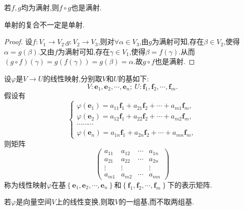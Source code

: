 \documentclass[lang=cn,newtx,10pt,scheme=chinese]{elegantbook}
\begin{document}
\begin{proposition}[满射的复合仍是满射]\label{proposition:满射的复合仍是满射}
    若\(f,g\)均为满射,则\(f\circ g\)也是满射.
\end{proposition}
\begin{remark}
    单射的复合不一定是单射.
\end{remark}
\begin{proof}
    设\(f:V_1\rightarrow V_2\),\(g:V_2\rightarrow V_3\),则对\(\forall \alpha \in V_3\),由\(g\)为满射可知,存在\(\beta \in V_2\),使得\(\alpha = g(\beta)\).又由\(f\)为满射可知,存在\(\gamma \in V_1\),使得\(\beta = f(\gamma)\).从而\((g\circ f)(\gamma)=g(f(\gamma)) = g(\beta)=\alpha\).故\(g\circ f\)也是满射.
\end{proof}

\begin{definition}[线性映射的表示矩阵]\label{definition:线性映射的表示矩阵}
设\(\varphi\)是\(V\to U\)的线性映射,分别取\(V\)和\(U\)的基如下:
\[
V:\boldsymbol{e}_1,\boldsymbol{e}_2,\cdots,\boldsymbol{e}_n; \ U:\boldsymbol{f}_1,\boldsymbol{f}_2,\cdots,\boldsymbol{f}_m.
\]
假设有
\[
\begin{cases}
\varphi(\boldsymbol{e}_1)=a_{11}\boldsymbol{f}_1 + a_{21}\boldsymbol{f}_2+\cdots + a_{m1}\boldsymbol{f}_m,\\
\varphi(\boldsymbol{e}_2)=a_{12}\boldsymbol{f}_1 + a_{22}\boldsymbol{f}_2+\cdots + a_{m2}\boldsymbol{f}_m,\\
\cdots\cdots\cdots\\
\varphi(\boldsymbol{e}_n)=a_{1n}\boldsymbol{f}_1 + a_{2n}\boldsymbol{f}_2+\cdots + a_{mn}\boldsymbol{f}_m,
\end{cases}
\]
则矩阵
\[
\begin{pmatrix}
a_{11}&a_{12}&\cdots&a_{1n}\\
a_{21}&a_{22}&\cdots&a_{2n}\\
\vdots&\vdots&&\vdots\\
a_{m1}&a_{m2}&\cdots&a_{mn}
\end{pmatrix}
\]
称为线性映射\(\varphi\)在基$\left\{ \boldsymbol{e}_1,\boldsymbol{e}_2,\cdots ,\boldsymbol{e}_n \right\}$和$\left\{ \boldsymbol{f}_1,\boldsymbol{f}_2,\cdots ,\boldsymbol{f}_m \right\}$下的表示矩阵.
\end{definition}
\begin{remark}
若\(\varphi\)是向量空间\(V\)上的线性变换,则取\(V\)的一组基,而不取两组基.
\end{remark}
\end{document}
